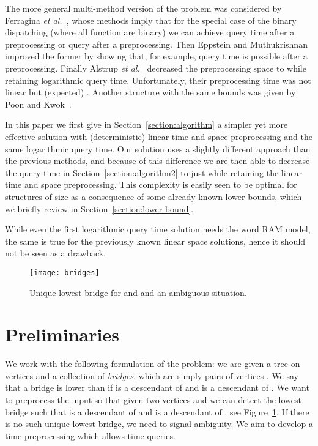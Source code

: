 \documentclass[runningheads]{llncs}
\begin{document}
The more general multi-method version of the problem was considered by Ferragina \emph{et al.}~\cite{Ferragina}, whose methods imply that for the special case of the binary dispatching (where all function are binary) we can achieve  query time after a  preprocessing or  query after a  preprocessing. Then Eppstein and Muthukrishnan~\cite{Eppstein} improved the former by showing that, for example,  query time is possible after a  preprocessing. Finally Alstrup \emph{et al.}~\cite{Alstrup} decreased the preprocessing space to  while retaining logarithmic query time. Unfortunately, their preprocessing time was not linear but (expected) . Another structure with the same bounds was given by Poon and Kwok~\cite{Poon}. 

In this paper we first give in Section~\ref{section:algorithm} a simpler yet more effective solution with (deterministic) linear time and space preprocessing and the same logarithmic query time. Our solution uses a slightly different approach than the previous methods, and because of this difference we are then able to decrease the query time in Section~\ref{section:algorithm2} to just  while retaining the linear time and space preprocessing. This complexity is easily seen to be optimal for structures of size  as a consequence of some already known lower bounds, which we briefly review in Section~\ref{section:lower bound}.

While even the first logarithmic query time solution needs the word RAM model, the same is true for the previously known linear space solutions, hence it should not be seen as a drawback.

\begin{figure}[t]
\centering
\texttt{[image: bridges]}
\caption{Unique lowest bridge for  and  and an ambiguous situation.}
\label{figure:bridges}
\end{figure}

\section{Preliminaries}

We work with the following formulation of the problem: we are given a tree  on  vertices and a collection of  \emph{bridges}, which are simply pairs of vertices . We say that a bridge  is lower than  if  is a descendant of  and  is a descendant of . We want to preprocess the input so that given two vertices  and  we can detect the lowest bridge  such that  is a descendant of  and  is a descendant of , see Figure~\ref{figure:bridges}. If there is no such unique lowest bridge, we need to signal ambiguity. We aim to develop a  time preprocessing which allows  time queries.
\end{document}
